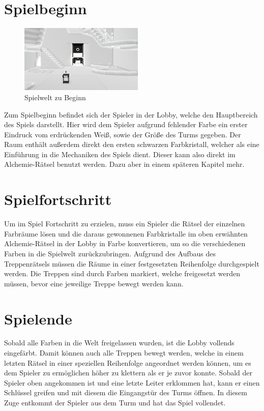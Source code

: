 \newpage
\noindent
\section{Spielbeginn}
\begin{figure}
	\vspace*{-0.5cm}
	\includegraphics[width=5.9cm]{Pictures/Lobby_Start}
	\caption{Spielwelt zu Beginn}
	\vspace*{-0.5cm}
	\label{fig:spielwelt-beginn}
\end{figure}

Zum Spielbeginn befindet sich der Spieler in der Lobby, welche den Hauptbereich des Spiels darstellt. Hier wird dem Spieler aufgrund fehlender Farbe ein erster Eindruck vom erdrückenden Weiß, sowie der Größe des Turms gegeben. Der Raum enthält außerdem direkt den ersten schwarzen Farbkristall, welcher als eine Einführung in die Mechaniken des Spiels dient. Dieser kann also direkt im Alchemie-Rätsel benutzt werden. Dazu aber in einem späteren Kapitel mehr.\\

\section{Spielfortschritt}
Um im Spiel Fortschritt zu erzielen, muss ein Spieler die Rätsel der einzelnen Farbräume lösen und die daraus gewonnenen Farbkristalle im oben erwähnten Alchemie-Rätsel in der Lobby in Farbe konvertieren, um so die verschiedenen Farben in die Spielwelt zurückzubringen.
Aufgrund des Aufbaus des Treppenrätsels müssen die Räume in einer festgesetzten Reihenfolge durchgespielt werden. Die Treppen sind durch Farben markiert, welche freigesetzt werden müssen, bevor eine jeweilige Treppe bewegt werden kann.

\section{Spielende}
Sobald alle Farben in die Welt freigelassen wurden, ist die Lobby vollends eingefärbt. Damit können auch alle Treppen bewegt werden, welche in einem letzten Rätsel in einer speziellen Reihenfolge angeordnet werden können, um es dem Spieler zu ermöglichen höher zu klettern als er je zuvor konnte. Sobald der Spieler oben angekommen ist und eine letzte Leiter erklommen hat, kann er einen Schlüssel greifen und mit diesem die Eingangstür des Turms öffnen. In diesem Zuge entkommt der Spieler aus dem Turm und hat das Spiel vollendet.



